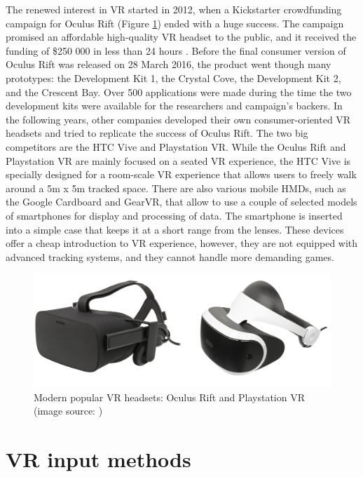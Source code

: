 The renewed interest in VR started in 2012, when a Kickstarter crowdfunding campaign for Oculus Rift (Figure \ref{fig:CONTROLLERS}) ended with a huge success. The campaign promised an affordable high-quality VR headset to the public, and it received the funding of \$250 000 in less than 24 hours \cite{VR_TECHNOLOGY}. Before the final consumer version of Oculus Rift was released on 28 March 2016, the product went though many prototypes: the Development Kit 1, the Crystal Cove, the Development Kit 2, and the Crescent Bay. Over 500 applications were made during the time the two development kits were available for the researchers and campaign's backers. In the following years, other companies developed their own consumer-oriented VR headsets and tried to replicate the success of Oculus Rift. The two big competitors are the HTC Vive and Playstation VR. While the Oculus Rift and Playstation VR are mainly focused on a seated VR experience, the HTC Vive is specially designed for a room-scale VR experience that allows users to freely walk around a 5m x 5m tracked space. There are also various mobile HMDs, such as the Google Cardboard and GearVR, that allow to use a couple of selected models of smartphones for display and processing of data. The smartphone is inserted into a simple case that keeps it at a short range from the lenses. These devices offer a cheap introduction to VR experience, however, they are not equipped with advanced tracking systems, and they cannot handle more demanding games.

\begin{figure}[th]
\centering
\includegraphics[width=1\textwidth]{img/headsets.png}
\caption{Modern popular VR headsets: Oculus Rift and Playstation VR (image source: \cite{OCULUS_HEADSET}\cite{PSVR_HEADSET})}
\label{fig:CONTROLLERS}
\end{figure}

\section{VR input methods}

